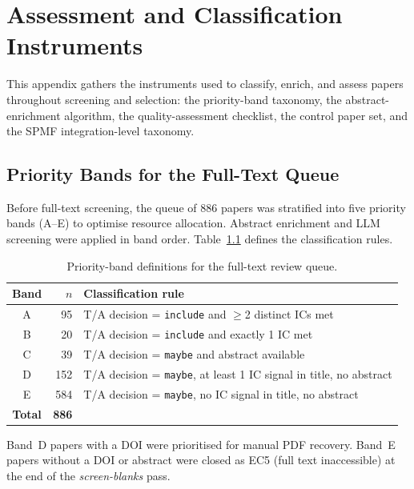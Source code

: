 \chapter{Assessment and Classification Instruments}
\label{app:H}

This appendix gathers the instruments used to classify, enrich, and assess
papers throughout screening and selection: the priority-band taxonomy, the
abstract-enrichment algorithm, the quality-assessment checklist, the control
paper set, and the SPMF integration-level taxonomy.

\section{Priority Bands for the Full-Text Queue}
\label{app:slr-bands}

Before full-text screening, the queue of 886 papers was stratified into five
priority bands (A--E) to optimise resource allocation. Abstract enrichment
and LLM screening were applied in band order.
Table~\ref{tab:app-bands} defines the classification rules.

\begin{table}[htbp]
\centering
\caption{Priority-band definitions for the full-text review queue.}
\label{tab:app-bands}
\small
\setlength{\tabcolsep}{4pt}
\begin{tabular}{c r p{8.5cm}}
\toprule
\textbf{Band} & \textbf{$n$} & \textbf{Classification rule} \\
\midrule
A & 95  & T/A decision = \texttt{include} and $\geq$2 distinct ICs met \\
B & 20  & T/A decision = \texttt{include} and exactly 1 IC met \\
C & 39  & T/A decision = \texttt{maybe} and abstract available \\
D & 152 & T/A decision = \texttt{maybe}, at least 1 IC signal in title, no abstract \\
E & 584 & T/A decision = \texttt{maybe}, no IC signal in title, no abstract \\
\midrule
\textbf{Total} & \textbf{886} & \\
\bottomrule
\end{tabular}
\end{table}

Band~D papers with a DOI were prioritised for manual PDF recovery.
Band~E papers without a DOI or abstract were closed as EC5 (full text
inaccessible) at the end of the \textit{screen-blanks} pass.


